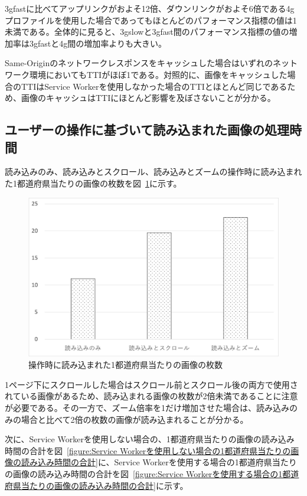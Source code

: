 3gfastに比べてアップリンクがおよそ12倍、ダウンリンクがおよそ6倍である4gプロファイルを使用した場合であってもほとんどのパフォーマンス指標の値は1未満である。全体的に見ると、3gslowと3gfast間のパフォーマンス指標の値の増加率は3gfastと4g間の増加率よりも大きい。

Same-Originのネットワークレスポンスをキャッシュした場合はいずれのネットワーク環境においてもTTIがほぼ1である。対照的に、画像をキャッシュした場合のTTIはService Workerを使用しなかった場合のTTIとほとんど同じであるため、画像のキャッシュはTTIにほとんど影響を及ぼさないことが分かる。

\subsection{ユーザーの操作に基づいて読み込まれた画像の処理時間}
\label{subsection:ユーザーの操作に基づいて読み込まれた画像の処理時間}
読み込みのみ、読み込みとスクロール、読み込みとズームの操作時に読み込まれた1都道府県当たりの画像の枚数を図~\ref{figure:操作時に読み込まれた1都道府県当たりの画像の枚数}に示す。

\begin{figure}
  \centering
  \includegraphics[width=\textwidth]{paper/images/loaded_image_count.png}
  \caption{操作時に読み込まれた1都道府県当たりの画像の枚数}\label{figure:操作時に読み込まれた1都道府県当たりの画像の枚数}
\end{figure}

1ページ下にスクロールした場合はスクロール前とスクロール後の両方で使用されている画像があるため、読み込まれる画像の枚数が2倍未満であることに注意が必要である。その一方で、ズーム倍率を1だけ増加させた場合は、読み込みのみの場合と比べて2倍の枚数の画像が読み込まれることが分かる。

次に、Service Workerを使用しない場合の、1都道府県当たりの画像の読み込み時間の合計を図~\ref{figure:Service Workerを使用しない場合の1都道府県当たりの画像の読み込み時間の合計}に、Service Workerを使用する場合の1都道府県当たりの画像の読み込み時間の合計を図~\ref{figure:Service Workerを使用する場合の1都道府県当たりの画像の読み込み時間の合計}に示す。

